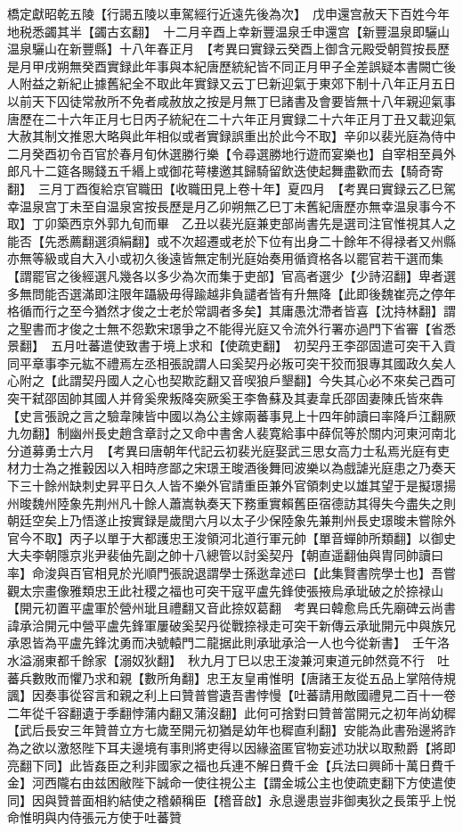 橋定獻昭乾五陵【行謁五陵以車駕經行近遠先後為次】　戊申還宫赦天下百姓今年地税悉蠲其半【蠲古玄翻】　十二月辛酉上幸新豐温泉壬申還宫【新豐温泉即驪山温泉驪山在新豐縣】十八年春正月　【考異曰實録云癸酉上御含元殿受朝賀按長歷是月甲戌朔無癸酉實録此年事與本紀唐歷統紀皆不同正月甲子全差誤疑本書闕亡後人附益之新紀止據舊紀全不取此年實録又云丁巳新迎氣于東郊下制十八年正月五日以前天下囚徒常赦所不免者咸赦放之按是月無丁巳諸書及會要皆無十八年親迎氣事唐歷在二十六年正月七日丙子統紀在二十六年正月實録二十六年正月丁丑又載迎氣大赦其制文推恩大略與此年相似或者實録誤重出於此今不取】辛卯以裴光庭為侍中　二月癸酉初令百官於春月旬休選勝行樂【令尋選勝地行遊而宴樂也】自宰相至員外郎凡十二筵各賜錢五千緡上或御花萼樓邀其歸騎留飲迭使起舞盡歡而去【騎奇寄翻】　三月丁酉復給京官職田【收職田見上卷十年】夏四月　【考異曰實録云乙巳駕幸温泉宫丁未至自温泉宮按長歷是月乙卯朔無乙巳丁未舊紀唐歷亦無幸温泉事今不取】丁卯築西京外郭九旬而畢　乙丑以裴光庭兼吏部尚書先是選司注官惟視其人之能否【先悉薦翻選須絹翻】或不次超遷或老於下位有出身二十餘年不得禄者又州縣亦無等級或自大入小或初久後遠皆無定制光庭始奏用循資格各以罷官若干選而集【謂罷官之後經選凡幾各以多少為次而集于吏部】官高者選少【少詩沼翻】卑者選多無問能否選滿即注限年躡級毋得踰越非負譴者皆有升無降【此即後魏崔亮之停年格循而行之至今猶然才俊之士老於常調者多矣】其庸愚沈滯者皆喜【沈持林翻】謂之聖書而才俊之士無不怨歎宋璟爭之不能得光庭又令流外行署亦過門下省審【省悉景翻】　五月吐蕃遣使致書于境上求和【使疏吏翻】　初契丹王李邵固遣可突干入貢同平章事李元紘不禮焉左丞相張說謂人曰奚契丹必叛可突干狡而狠專其國政久矣人心附之【此謂契丹國人之心也契欺訖翻又音喫狼戶墾翻】今失其心必不來矣己酉可突干弑邵固帥其國人并脅奚衆叛降突厥奚王李魯蘇及其妻韋氏邵固妻陳氏皆來犇【史言張說之言之驗韋陳皆中國以為公主嫁兩蕃事見上十四年帥讀曰率降戶江翻厥九勿翻】制幽州長史趙含章討之又命中書舍人裴寛給事中薛侃等於關内河東河南北分道募勇士六月　【考異曰唐朝年代記云初裴光庭娶武三思女高力士私焉光庭有吏材力士為之推轂因以入相時彦鄙之宋璟王晙酒後舞囘波樂以為戲謔光庭患之乃奏天下三十餘州缺刺史昇平日久人皆不樂外官請重臣兼外官領刺史以雄其望于是擬璟揚州晙魏州陸象先荆州凡十餘人蕭嵩執奏天下務重實賴舊臣宿德訪其得失今盡失之則朝廷空矣上乃悟遂止按實録是歲閏六月以太子少保陸象先兼荆州長史璟晙未嘗除外官今不取】丙子以單于大都護忠王浚領河北道行軍元帥【單音蟬帥所類翻】以御史大夫李朝隱京兆尹裴伷先副之帥十八總管以討奚契丹【朝直遥翻伷與胄同帥讀曰率】命浚與百官相見於光順門張說退謂學士孫逖韋述曰【此集賢書院學士也】吾嘗觀太宗畫像雅類忠王此社稷之福也可突干寇平盧先鋒使張掖烏承玼破之於捺禄山【開元初置平盧軍於營州玼且禮翻又音此捺奴葛翻　考異曰韓愈烏氏先廟碑云尚書諱承洽開元中營平盧先鋒軍屢破奚契丹從戰捺禄走可突干新傳云承玼開元中與族兄承恩皆為平盧先鋒沈勇而决號轅門二龍据此則承玼承洽一人也今從新書】　壬午洛水溢溺東都千餘家【溺奴狄翻】　秋九月丁巳以忠王浚兼河東道元帥然竟不行　吐蕃兵數敗而懼乃求和親【數所角翻】忠王友皇甫惟明【唐諸王友從五品上掌陪侍規諷】因奏事從容言和親之利上曰贊普嘗遺吾書悖慢【吐蕃請用敵國禮見二百十一卷二年從千容翻遺于季翻悖蒲内翻又蒲沒翻】此何可捨對曰贊普當開元之初年尚幼穉【武后長安三年贊普立方七歲至開元初猶是幼年也穉直利翻】安能為此書殆邊將詐為之欲以激怒陛下耳夫邊境有事則將吏得以因緣盗匿官物妄述功狀以取勲爵【將即亮翻下同】此皆姦臣之利非國家之福也兵連不解日費千金【兵法曰興師十萬日費千金】河西隴右由兹困敝陛下誠命一使往視公主【謂金城公主也使疏吏翻下方使遣使同】因與贊普面相約結使之稽顙稱臣【稽音啟】永息邊患豈非御夷狄之長策乎上悦命惟明與内侍張元方使于吐蕃贊